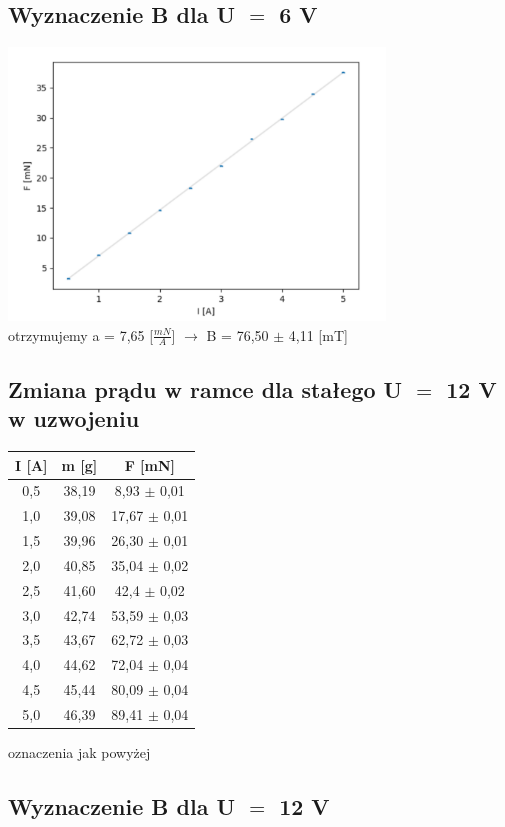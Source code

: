 \documentclass{article}
\begin{document}
\subsection{Wyznaczenie B dla U $=$ 6 V}
\includegraphics[width=10cm]{CHUJ}
\\otrzymujemy a = 7,65 [$\frac{mN}{A}$] $\rightarrow$ B = 76,50 $\pm$ 4,11 [mT]

\subsection{Zmiana prądu w ramce dla stałego U $=$ 12 V w uzwojeniu}

\begin{center}
\begin{tabular}{ c | c | c}
I [A] & m [g] & F [mN]\\
\hline
0,5 & 38,19 & 8,93 $\pm$ 0,01\\
1,0 & 39,08 & 17,67 $\pm$ 0,01\\
1,5 & 39,96 & 26,30 $\pm$ 0,01\\
2,0 & 40,85 & 35,04 $\pm$ 0,02\\
2,5 & 41,60 & 42,4 $\pm$ 0,02\\
3,0 & 42,74 & 53,59 $\pm$ 0,03\\
3,5 & 43,67 & 62,72 $\pm$ 0,03\\ 
4,0 & 44,62 & 72,04 $\pm$ 0,04\\
4,5 & 45,44 & 80,09 $\pm$ 0,04\\
5,0 & 46,39 & 89,41 $\pm$ 0,04\\
\end{tabular}
\end{center}
oznaczenia jak powyżej

\subsection{Wyznaczenie B dla U $=$ 12 V}
\end{document}
